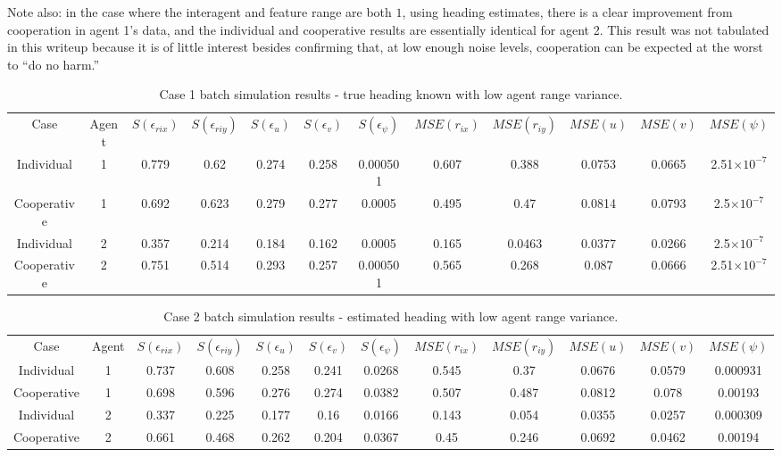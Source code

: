 \documentclass{aiaa-tc}
\begin{document}
Note also: in the case where the interagent and feature range are both $1$, using heading estimates, there is a clear improvement from cooperation in agent 1's data, and the individual and cooperative results are essentially identical for agent 2. This result was not tabulated in this writeup because it is of little interest besides confirming that, at low enough noise levels, cooperation can be expected at the worst to ``do no harm.''

\begin{table}[tb!]
\scriptsize
\centering
\begin{tabular}{c|c|c|c|c|c|c|c|c|c|c|c|}
Case & Agent & $S(\epsilon_{rix})$ & $S(\epsilon_{riy})$ & $S(\epsilon_{u})$ & $S(\epsilon_{v})$ & $S(\epsilon_{\psi})$ & $MSE(r_{ix})$ & $MSE(r_{iy})$ & $MSE(u)$ & $MSE(v)$ & $MSE(\psi)$ \\
Individual & 1& 0.779& 0.62& 0.274& 0.258& 0.000501& 0.607& 0.388& 0.0753& 0.0665& 2.51$\times 10^{-7}$ \\
Cooperative & 1& 0.692& 0.623& 0.279& 0.277& 0.0005& 0.495& 0.47& 0.0814& 0.0793& 2.5$\times 10^{-7}$ \\
Individual & 2& 0.357& 0.214& 0.184& 0.162& 0.0005& 0.165& 0.0463& 0.0377& 0.0266& 2.5$\times 10^{-7}$ \\
Cooperative & 2& 0.751& 0.514& 0.293& 0.257& 0.000501& 0.565& 0.268& 0.087& 0.0666& 2.51$\times 10^{-7}$ \\
\end{tabular}
\caption{Case 1 batch simulation results - true heading known with low agent range variance.}
\label{tab:case1}
\end{table}

\begin{table}[tb!]
\scriptsize
\centering
\begin{tabular}{c|c|c|c|c|c|c|c|c|c|c|c|}
Case & Agent & $S(\epsilon_{rix})$ & $S(\epsilon_{riy})$ & $S(\epsilon_{u})$ & $S(\epsilon_{v})$ & $S(\epsilon_{\psi})$ & $MSE(r_{ix})$ & $MSE(r_{iy})$ & $MSE(u)$ & $MSE(v)$ & $MSE(\psi)$ \\
Individual & 1& 0.737& 0.608& 0.258& 0.241& 0.0268& 0.545& 0.37& 0.0676& 0.0579& 0.000931 \\
Cooperative & 1& 0.698& 0.596& 0.276& 0.274& 0.0382& 0.507& 0.487& 0.0812& 0.078& 0.00193 \\
Individual & 2& 0.337& 0.225& 0.177& 0.16& 0.0166& 0.143& 0.054& 0.0355& 0.0257& 0.000309 \\
Cooperative & 2& 0.661& 0.468& 0.262& 0.204& 0.0367& 0.45& 0.246& 0.0692& 0.0462& 0.00194 \\
\end{tabular}
\caption{Case 2 batch simulation results - estimated heading with low agent range variance.}
\end{table}
\end{document}
